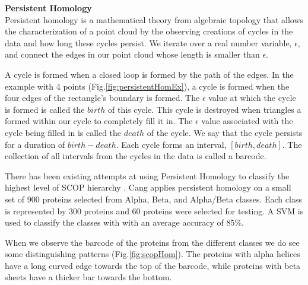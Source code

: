 \documentclass[12pt, a4paper, twocolumn, fullpage]{article}
\theoremstyle{plain}
\theoremstyle{definition}
\theoremstyle{remark}
\begin{document}
\noindent
\textbf{Persistent Homology}  \\
Persistent homology is a mathematical theory from algebraic topology that allows the characterization of a point cloud by the observing creations of cycles in the data and how long these cycles persist. We iterate over a real number variable, $\epsilon$, and connect the edges in our point cloud whose length is smaller than $\epsilon$. 

A cycle is formed when a closed loop is formed by the path of the edges. In the example with 4 points (Fig.\ref{fig:persistentHomEx}), a cycle is formed when the four edges of the rectangle's boundary is formed. The $\epsilon$ value at which the cycle is formed is called the $birth$ of this cycle. This cycle is destroyed when triangles a formed within our cycle to completely fill it in. The $\epsilon$ value associated with the cycle being filled in is called the $death$ of the cycle. We say that the cycle persists for a duration of $birth-death$. Each cycle forms an interval, $[birth, death]$. The collection of all intervals from the cycles in the data is called a barcode.

There has been existing attempts at using Persistent Homology to classify the highest level of SCOP hierarchy \cite{SCOPHom}. Cang applies persistent homology on a small set of 900 proteins selected from Alpha, Beta, and Alpha/Beta classes. Each class is represented by 300 proteins and 60 proteins were selected for testing. A SVM is used to classify the classes with with an average accuracy of 85\%. 

When we observe the barcode of the proteins from the different classes we do see some distinguishing patterns (Fig.\ref{fig:scopHom}). The proteins with alpha helices have a long curved edge towards the top of the barcode, while proteins with beta sheets have a thicker bar towards the bottom.
\end{document}
